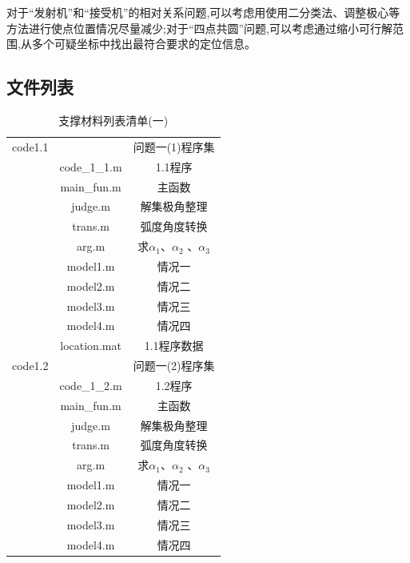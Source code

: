 \documentclass[withoutpreface,bwprint]{cumcmthesis} %
\begin{document}
			对于“发射机”和“接受机”的相对关系问题,可以考虑用使用二分类法、调整极心等方法进行使点位置情况尽量减少;对于“四点共圆”问题,可以考虑通过缩小可行解范围,从多个可疑坐标中找出最符合要求的定位信息。
	\newpage
	
	\newpage
	\begin{appendices}
		\section{文件列表}
		\begin{table}[htbp]
			\renewcommand\arraystretch{0.1}
			\tabcolsep=0.2cm
			\centering
			\caption{支撑材料列表清单(一)}
			\begin{tabular}{ccc}
				\toprule[1.5pt]
				\makebox[0.27\textwidth][c]{文件夹名}	& \makebox[0.3\textwidth][c]{文件夹内容}	& \makebox[0.4\textwidth][c]{文件描述} \\ 
				\midrule
		code1.1	& & 问题一(1)程序集 \\
		 	&code\_1\_1.m  & 1.1程序 \\
		 	
		 	 	&main\_fun.m  & 主函数\\
		 	 	
		 	 	 	&judge.m  & 解集极角整理\\
		 	 	 	
		 	 	 		&trans.m  & 弧度角度转换 \\
		 	 	 			&arg.m & 求$\alpha_{1}$、$\alpha_{2}$ 、$\alpha_{3}$  \\
		 	 	 				&model1.m  & 情况一 \\
		 	 	 				&model2.m  & 情况二 \\
		 	 	 				&model3.m  & 情况三 \\
		 	 	 				&model4.m  & 情况四 \\
		 	 	 				&location.mat  & 1.1程序数据 \\
		 	 	 				
		code1.2	&& 问题一(2)程序集 \\
			
				&code\_1\_2.m  & 1.2程序 \\
				
				&main\_fun.m  & 主函数\\
				
				&judge.m  & 解集极角整理\\
				
				&trans.m  & 弧度角度转换 \\
				&arg.m & 求$\alpha_{1}$、$\alpha_{2}$ 、$\alpha_{3}$  \\
				&model1.m  & 情况一 \\
				&model2.m  & 情况二 \\
				&model3.m  & 情况三 \\
				&model4.m  & 情况四 \\
				

\end{tabular}
\end{table}
\end{appendices}
\end{document}
